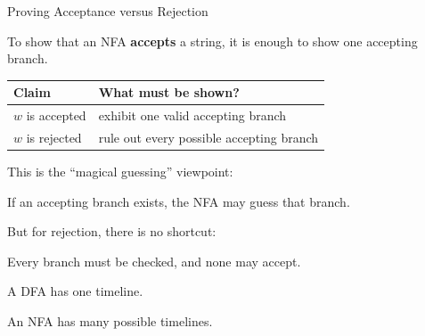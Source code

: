 \documentclass[10pt,aspectratio=169]{beamer}
\begin{document}
\begin{frame}{Proving Acceptance versus Rejection}

To show that an NFA \textbf{accepts} a string, it is enough to show one accepting branch.

\vspace{0.7em}

\begin{center}
\begin{tabular}{ll}
\toprule
\textbf{Claim} & \textbf{What must be shown?}\\
\midrule
\(w\) is accepted & exhibit one valid accepting branch\\
\(w\) is rejected & rule out every possible accepting branch\\
\bottomrule
\end{tabular}
\end{center}

\vspace{0.8em}

\pause

This is the ``magical guessing'' viewpoint:

\begin{center}
If an accepting branch exists, the NFA may guess that branch.
\end{center}

\vspace{0.6em}

\pause

But for rejection, there is no shortcut:

\begin{center}
Every branch must be checked, and none may accept.
\end{center}

\end{frame}
\begin{frame}[standout]
A DFA has one timeline.

An NFA has many possible timelines.
\end{frame}
\end{document}
